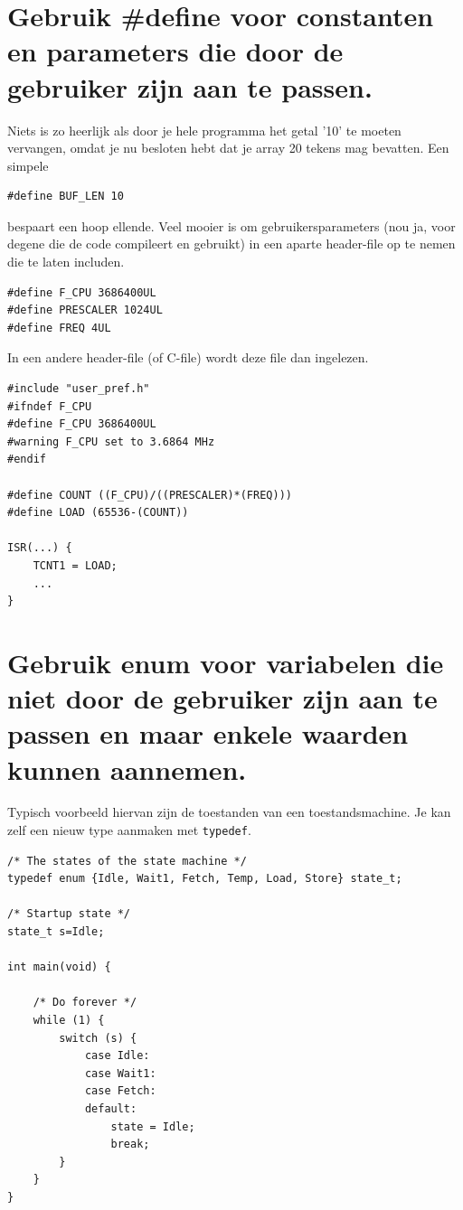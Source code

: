 \documentclass[12pt,a4paper,final,oneside,fleqn]{article}
\begin{document}
\section{Gebruik \#define voor constanten en parameters die door de gebruiker zijn aan te passen.}
Niets is zo heerlijk als door je hele programma het getal '10' te moeten vervangen,
omdat je nu besloten hebt dat je array 20 tekens mag bevatten. Een simpele

\begin{lstlisting}[style=nonumbers,belowcaptionskip=-12pt]
#define BUF_LEN 10
\end{lstlisting}

\noindent
bespaart een hoop ellende. Veel mooier is om gebruikersparameters (nou ja, voor degene
die de code compileert en gebruikt) in een aparte header-file op te nemen die te laten includen.

\begin{lstlisting}[style=nonumbers,caption=Voorbeeld header file met User Preferences]
#define F_CPU 3686400UL
#define PRESCALER 1024UL
#define FREQ 4UL
\end{lstlisting}

\noindent
In een andere header-file (of C-file) wordt deze file dan ingelezen.

\begin{lstlisting}[style=nonumbers,caption=Gebruik van header file]
#include "user_pref.h"
#ifndef F_CPU
#define F_CPU 3686400UL
#warning F_CPU set to 3.6864 MHz
#endif

#define COUNT ((F_CPU)/((PRESCALER)*(FREQ)))
#define LOAD (65536-(COUNT))

ISR(...) {
	TCNT1 = LOAD;
	...
}
\end{lstlisting}

\section{Gebruik enum voor variabelen die niet door de gebruiker zijn 
aan te passen en maar enkele waarden kunnen aannemen.}
Typisch voorbeeld hiervan zijn de toestanden van een toestandsmachine.
Je kan zelf een nieuw type aanmaken met \texttt{typedef}.

\begin{lstlisting}[style=numbers,caption=Voorbeeld van een toestandsmachine]
/* The states of the state machine */
typedef enum {Idle, Wait1, Fetch, Temp, Load, Store} state_t;

/* Startup state */
state_t s=Idle;

int main(void) {

	/* Do forever */
	while (1) {
		switch (s) {
			case Idle:
			case Wait1:
			case Fetch:
			default:
				state = Idle;
				break;
		}
	}
}
\end{lstlisting}
\end{document}
